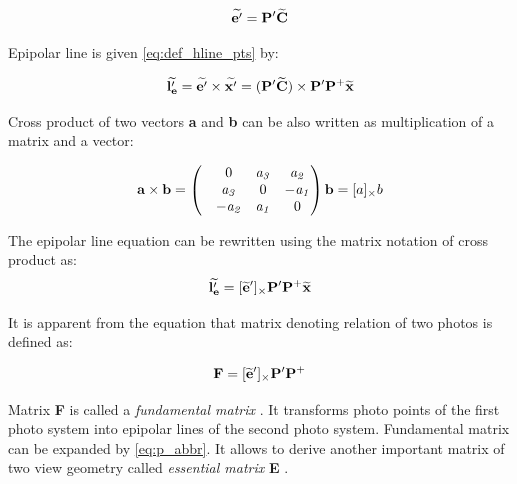 \documentclass[a4paper,12pt]{article}
\newcommand{\ematr}[1]{%
{\bf #1}%
}
\newcommand{\evect}[1]{%
{\bf #1}%
}
\newcommand{\ehvect}[1]{%
{\bf \widetilde{#1}}%
}
\newcommand{\escal}[1]{%
{\it #1}%
}
\newcommand{\term}[1]{%
{\it #1}%
}
\begin{document}
\begin{equation}
\ehvect{e'} =  \ematr{P'}\ehvect{C} \\
\end{equation}





Epipolar line is given \eqref{eq:def_hline_pts} by:

\begin{equation}
\ehvect{l'_{e}} =  \ehvect{e'} \times \ehvect{x'} = (\ematr{P'}\ehvect{C}) \times \ematr{P'}\ematr{P}^{+}\ehvect{x}
\end{equation}

Cross product of two vectors \evect{a} and \evect{b} can be also written as multiplication of a matrix and a vector:

\begin{equation}
\evect{a}  \times \evect{b}  = 
\begin{pmatrix}
   & 0      & \escal{a_{3}}   & \escal{a_{2}}\\
   & \escal{a_{3}}  & 0               & \escal{-a_{1}}\\
   & \escal{-a_{2}} & \escal{a_{1}}   & 0\\
\end{pmatrix}
\evect{b} = [a]_{\times} b
\end{equation}

The epipolar line equation can be rewritten using the matrix notation of cross product as:
\begin{equation}
\ehvect{l'_{e}}  = [\ehvect{e}']_{\times} \ematr{P'}\ematr{P}^{+}\ehvect{x}
\end{equation}


It is apparent from the equation that matrix denoting relation of two photos is defined as:

\begin{equation}
\ematr{F}  = [\ehvect{e}']_{\times} \ematr{P'}\ematr{P}^{+}
\end{equation}

Matrix \ematr{F} is called a \term{fundamental matrix} \cite{Hartley2004}. 
It transforms photo points of the first photo system into 
epipolar lines of the second photo system.
Fundamental matrix can be expanded by \eqref{eq:p_abbr}.
It allows to derive another important matrix of two view geometry called \term{essential matrix} \ematr{E}.
\end{document}
